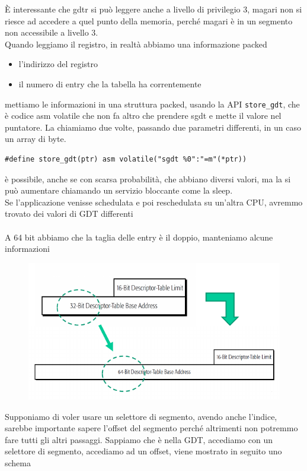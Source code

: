 \documentclass[12pt, oneside]{extbook}
\begin{document}
È interessante che gdtr si può leggere anche a livello di privilegio 3, magari non si riesce ad accedere a quel punto della memoria, perché magari è in un segmento non accessibile a livello 3.\\ Quando leggiamo il registro, in realtà abbiamo una informazione packed
\begin{itemize}
\item l'indirizzo del registro
\item il numero di entry che la tabella ha correntemente
\end{itemize}
mettiamo le informazioni in una struttura packed, usando la API \texttt{store\_gdt}, che è codice asm volatile che non fa altro che prendere sgdt e mette il valore nel puntatore. La chiamiamo due volte, passando due parametri differenti, in un caso un array di byte.
\begin{lstlisting}
#define store_gdt(ptr) asm volatile("sgdt %0":"=m"(*ptr))
\end{lstlisting}
è possibile, anche se con scarsa probabilità, che abbiano diversi valori, ma la si può aumentare chiamando un servizio bloccante come la sleep.\\Se l'applicazione venisse schedulata e poi reschedulata su un'altra CPU, avremmo trovato dei valori di GDT differenti\\\\ A 64 bit abbiamo che la taglia delle entry è il doppio,  manteniamo alcune informazioni 
\begin{figure}[!h]
	\includegraphics[scale=0.5]{immagini/64bit_gdtr_entry.png}
\end{figure}
Supponiamo di voler usare un selettore di segmento, avendo anche l'indice, sarebbe importante sapere l'offset del segmento perché altrimenti non potremmo fare tutti gli altri passaggi. Sappiamo che è nella GDT, accediamo con un selettore di segmento, accediamo ad un offset, viene  mostrato in seguito uno schema
\end{document}
